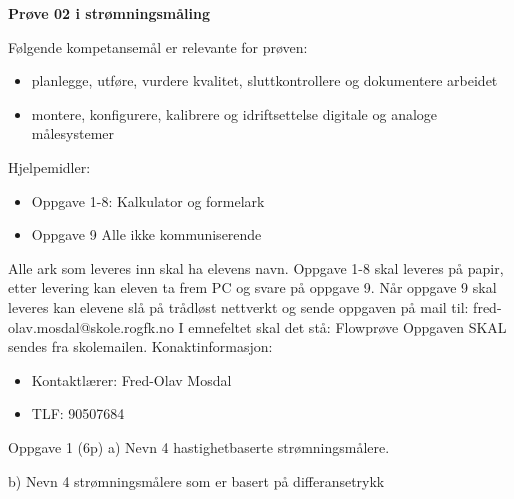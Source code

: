 
\begin{centering}
\Huge{\textbf{Prøve 02 i strømningsmåling}}\\
\end{centering}
\vskip 2cm 
Følgende kompetansemål er relevante for prøven:
\begin{itemize}[noitemsep]

	\item planlegge, utføre, vurdere kvalitet, sluttkontrollere og dokumentere arbeidet
	\item montere, konfigurere, kalibrere og idriftsettelse digitale og analoge målesystemer
\end{itemize}
\vskip 2.5pt 
Hjelpemidler:\begin{itemize}[noitemsep]
	\item Oppgave 1-8: Kalkulator og formelark
	\item Oppgave 9 Alle ikke kommuniserende
\end{itemize}

\vskip 5pt 
\vskip 10pt 
Alle ark som leveres inn skal ha elevens navn.
\vskip 2.5pt 
Oppgave 1-8 skal leveres på papir, etter levering kan eleven ta frem PC og svare på oppgave 9. 
\vskip 2.5pt 
Når oppgave 9 skal leveres kan elevene slå på trådløst nettverkt og sende oppgaven på mail til:
\vskip 2.5pt 
fred-olav.mosdal@skole.rogfk.no
\vskip 2.5pt 
I emnefeltet skal det stå: Flowprøve
\vskip 2.5pt
Oppgaven SKAL sendes fra skolemailen. 
\vskip 2cm   
Konaktinformasjon:
\begin{itemize}[noitemsep]
	\item Kontaktlærer: Fred-Olav Mosdal
	\item TLF: 90507684
\end{itemize}


\vfil \eject
Oppgave 1 (6p)%
\vskip 2.5pt 
a) Nevn 4 hastighetbaserte strømningsmålere. \\
\vskip 2.5pt 
\vskip 2.5pt 
b) Nevn 4 strømningsmålere som er basert på differansetrykk\\
\vskip 2.5pt 
\vskip 2.5pt 


